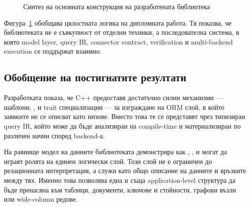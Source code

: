 \begin{figure}[H]
\centering
{}
\caption{Синтез на основната конструкция на разработената библиотека}
\label{fig:thesis_synthesis}
\end{figure}

Фигура~\ref{fig:thesis_synthesis} обобщава цялостната логика на дипломната работа. Тя показва, че библиотеката не е съвкупност от отделни техники, а последователна система, в която model layer, query IR, connector contract, verification и multi-backend execution се поддържат взаимно.

\subsection{Обобщение на постигнатите резултати}

Разработката показа, че C++ предоставя достатъчно силни механизми --- шаблони, ,  и trait специализации --- за изграждане на ORM слой, в който заявките не се описват като низове. Вместо това те се представят чрез типизиран query IR, който може да бъде анализиран на compile-time и материализиран по различен начин според backend-а.

На равнище модел на данните библиотеката демонстрира как , ,  и  могат да играят ролята на единен логически слой. Този слой не е ограничен до релационната интерпретация, а служи като общо описание на данните и връзките между тях. Именно това позволява една и съща application-level структура да бъде пренасяна към таблици, документи, ключове и стойности, графови възли или wide-column редове.

